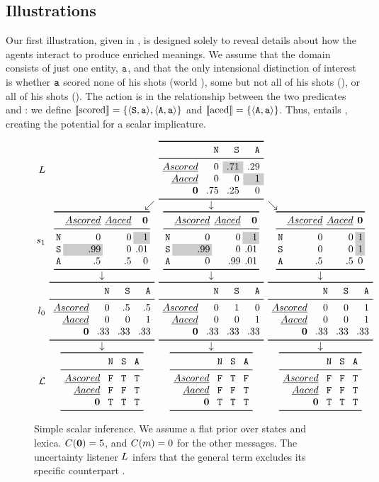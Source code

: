 \documentclass[leqno]{article}
\begin{document}

\subsection{Illustrations}

Our first illustration, given in , is
designed solely to reveal details about how the agents interact to
produce enriched meanings. We assume that the domain consists of just
one entity, $\texttt{a}$, and that the only intensional distinction of
interest is whether $\texttt{a}$ scored none of his shots (world
), some but not all of his shots (), or all of his
shots (). The action is in the relationship between the two
predicates  and : we define $\llbracket\text{scored}\rrbracket =
\left\{ \langle \texttt{S}, \texttt{a} \rangle, \langle \texttt{A}, \texttt{a} \rangle \right\}$ and
$\llbracket\text{aced}\rrbracket = \left\{ \langle \texttt{A}, \texttt{a} \rangle \right\}$. Thus, 
entails , creating the potential for a scalar
implicature.

\begin{figure}[t]
  \[
  \setlength{\arraycolsep}{2pt}
  \begin{array}{r c c c}
    \UncertaintyListener &
    \multicolumn{3}{c}{\genericscalar{0}{\graycell{.71}}{.29}{0}{0}{\graycell{1}}{.75}{.25}{0}}
    \\
    & \multicolumn{1}{r}{\swarrow} & \multicolumn{1}{c}{\downarrow} & \multicolumn{1}{l}{\searrow} 
    \\
    \speakerOne
    &
    \scalarspeaker{0}{0}{\graycell{1}}{\graycell{.99}}{0}{.01}{.5}{.5}{0}
    &
    \scalarspeaker{0}{0}{\graycell{1}}{\graycell{.99}}{0}{.01}{0}{.99}{.01}
    &
    \scalarspeaker{0}{0}{\graycell{1}}{0}{0}{\graycell{1}}{.5}{.5}{0}
    \\
    & \downarrow & \downarrow & \downarrow
    \\
    \listenerZero
    &
    \genericscalar{0}{.5}{.5}{0}{0}{1}{.33}{.33}{.33}
    &
    \genericscalar{0}{1}{0}{0}{0}{1}{.33}{.33}{.33}
    &
    \genericscalar{0}{0}{1}{0}{0}{1}{.33}{.33}{.33}
    \\
    & \downarrow & \downarrow & \downarrow 
    \\    
    \Lex
    &
    \genericscalar{\False}{\True}{\True}{\False}{\False}{\True}{\True}{\True}{\True}
    &
    \genericscalar{\False}{\True}{\False}{\False}{\False}{\True}{\True}{\True}{\True}
    &
    \genericscalar{\False}{\False}{\True}{\False}{\False}{\True}{\True}{\True}{\True}
  \end{array}
  \]
  \caption{Simple scalar inference. We assume a flat prior over states
    and lexica. $C(\mathbf{0}) = 5$, and $C(m) = 0$ for
    the other messages. The uncertainty listener $L$
    infers that the general term  excludes its specific counterpart
    .}
  \label{fig:simplescalar}
\end{figure}
\end{document}
